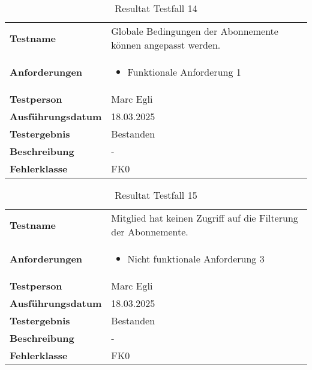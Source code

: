 \begin{table}[H]
    \begin{tabular}{|L{0.3\textwidth}|L{0.65\textwidth}|}
        \hline
           \\[10pt]
        \hline
        \textbf{Testname} & Globale Bedingungen der Abonnemente können angepasst werden. \\
        \hline
        \textbf{Anforderungen} & 
        \begin{itemize}
            \item Funktionale Anforderung 1
        \end{itemize} \\
        \hline
        \textbf{Testperson} & Marc Egli \\
        \hline
        \textbf{Ausführungsdatum} & 18.03.2025 \\
        \hline
        \textbf{Testergebnis} & Bestanden \\
        \hline
        \textbf{Beschreibung} & - \\ 
        \hline
        \textbf{Fehlerklasse} & FK0 \\ 
        \hline
    \end{tabular}
    \caption{Resultat Testfall 14}
\end{table}

\begin{table}[H]
    \begin{tabular}{|L{0.3\textwidth}|L{0.65\textwidth}|}
        \hline
           \\[10pt]
        \hline
        \textbf{Testname} & Mitglied hat keinen Zugriff auf die Filterung der Abonnemente. \\
        \hline
        \textbf{Anforderungen} & 
        \begin{itemize}
            \item Nicht funktionale Anforderung 3
        \end{itemize} \\
        \hline
        \textbf{Testperson} & Marc Egli \\
        \hline
        \textbf{Ausführungsdatum} & 18.03.2025 \\
        \hline
        \textbf{Testergebnis} & Bestanden \\
        \hline
        \textbf{Beschreibung} & - \\ 
        \hline
        \textbf{Fehlerklasse} & FK0 \\ 
        \hline
    \end{tabular}
    \caption{Resultat Testfall 15}
\end{table}

